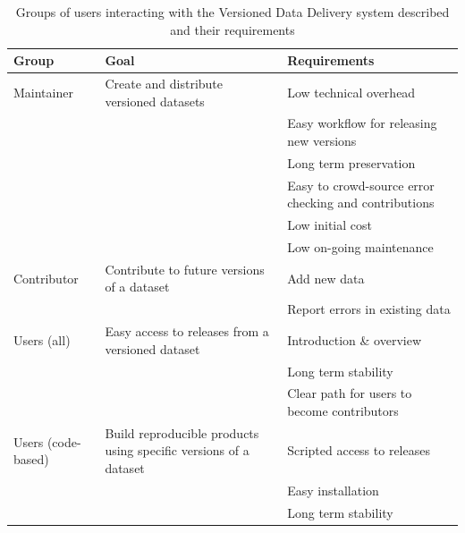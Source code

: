 \documentclass[a4paper,11pt]{article}
\begin{document}
\begin{table}[h!]
\centering
\caption{Groups of users interacting with the Versioned Data Delivery system described and their requirements}
{\footnotesize
\vspace{1cm}
  \begin{tabular}{p{2cm}p{5cm}p{7cm}}
  \hline
  \textbf{Group} & \textbf{Goal} & \textbf{Requirements} \\ \hline
  Maintainer & Create and distribute versioned datasets & Low technical overhead \\
    & & Easy workflow for releasing new versions \\
    & & Long term preservation \\
    & & Easy to crowd-source error checking and contributions \\
    & & Low initial cost \\
    & & Low on-going maintenance \\
  Contributor & Contribute to future versions of a dataset & Add new data \\
    & & Report errors in existing data  \\
  Users (all) & Easy access to releases from a versioned dataset & Introduction \& overview \\
    & & Long term stability \\
    & & Clear path for users to become contributors \\
  Users (code-based) & Build reproducible products using specific versions of a dataset & Scripted access to releases\\
    & & Easy installation\\
    & & Long term stability \\
  \hline
  \end{tabular}
}
\label{tab:user_requirements}
\end{table}

\newpage
\end{document}

